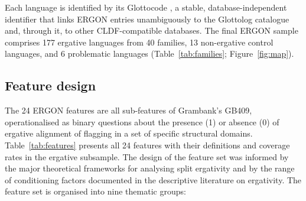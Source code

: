 \documentclass[12pt,a4paper]{article}
\begin{document}
Each language is identified by its Glottocode \cite{hammarstrom2024}, a stable, database-independent identifier that links ERGON entries unambiguously to the Glottolog catalogue and, through it, to other CLDF-compatible databases. The final ERGON sample comprises 177 ergative languages from 40 families, 13 non-ergative control languages, and 6 problematic languages (Table~\ref{tab:families}; Figure~\ref{fig:map}).

\subsection{Feature design}

The 24 ERGON features are all sub-features of Grambank's GB409, operationalised as binary questions about the presence (1) or absence (0) of ergative alignment of flagging in a set of specific structural domains. Table~\ref{tab:features} presents all 24 features with their definitions and coverage rates in the ergative subsample. The design of the feature set was informed by the major theoretical frameworks for analysing split ergativity and by the range of conditioning factors documented in the descriptive literature on ergativity. The feature set is organised into nine thematic groups:
\end{document}
